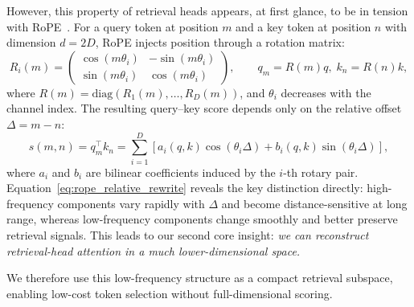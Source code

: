 \documentclass{llmxive}
\begin{document}
However, this property of retrieval heads appears, at first glance, to be in tension with RoPE~\citep{rope}. For a query token at position $m$ and a key token at position $n$ with dimension $d = 2D$, RoPE injects position through a rotation matrix:
{\setlength{\abovedisplayskip}{4pt}\setlength{\belowdisplayskip}{4pt}\setlength{\abovedisplayshortskip}{2pt}\setlength{\belowdisplayshortskip}{2pt}
\begin{equation}
\label{eq:rope_pair_rotation}
R_i(m)=
\begin{pmatrix}
\cos(m\theta_i) & -\sin(m\theta_i)\\
\sin(m\theta_i) & \cos(m\theta_i)
\end{pmatrix},
\qquad
q_m=R(m)q,\; k_n=R(n)k,
\end{equation}}
where $R(m)=\mathrm{diag}(R_1(m),\dots,R_D(m))$, and $\theta_i$ decreases with the channel index. The resulting query--key score depends only on the relative offset $\Delta=m-n$:
{\setlength{\abovedisplayskip}{4pt}\setlength{\belowdisplayskip}{4pt}\setlength{\abovedisplayshortskip}{2pt}\setlength{\belowdisplayshortskip}{2pt}
\begin{equation}
\label{eq:rope_relative_rewrite}
s(m,n)=q_m^{\top}k_n
=\sum_{i=1}^{D}\left[a_i(q,k)\cos(\theta_i\Delta) + b_i(q,k)\sin(\theta_i\Delta)\right],
\end{equation}}
where $a_i$ and $b_i$ are bilinear coefficients induced by the $i$-th rotary pair. Equation~\eqref{eq:rope_relative_rewrite} reveals the key distinction directly: high-frequency components vary rapidly with $\Delta$ and become distance-sensitive at long range, whereas low-frequency components change smoothly and better preserve retrieval signals. This leads to our second core insight: \emph{we can reconstruct retrieval-head attention in a much lower-dimensional space.}


We therefore use this low-frequency structure as a compact retrieval subspace, enabling low-cost token selection without full-dimensional scoring.
\end{document}
